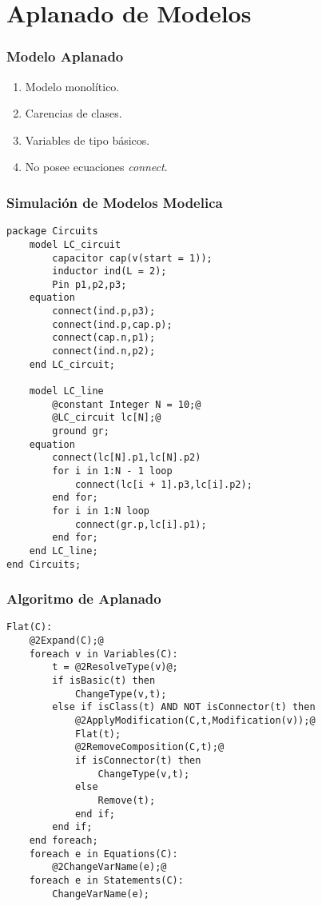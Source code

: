 \section{Aplanado de Modelos}

\begin{frame}[fragile]
\frametitle{Modelo Aplanado} 
\begin{enumerate}
\item Modelo monolítico.
\item Carencias de clases.
\item Variables de tipo básicos.
\item No posee ecuaciones \textit{connect}.


\end{enumerate}
\end{frame}

\begin{frame}[fragile]
\frametitle{Simulación de Modelos Modelica} 
\begin{lstlisting}[style=base,basicstyle=\tiny]
package Circuits
    model LC_circuit
        capacitor cap(v(start = 1));
        inductor ind(L = 2);
        Pin p1,p2,p3;
    equation
        connect(ind.p,p3);
        connect(ind.p,cap.p);
        connect(cap.n,p1);
        connect(ind.n,p2);
    end LC_circuit;
    
    model LC_line
        @constant Integer N = 10;@
        @LC_circuit lc[N];@
        ground gr;
    equation
        connect(lc[N].p1,lc[N].p2)      
        for i in 1:N - 1 loop
            connect(lc[i + 1].p3,lc[i].p2);
        end for;
        for i in 1:N loop
            connect(gr.p,lc[i].p1);
        end for;
    end LC_line;
end Circuits;   
\end{lstlisting}
\end{frame}

\begin{frame}[fragile]
\frametitle{Algoritmo de Aplanado} 
\begin{lstlisting}[style=base,basicstyle=\tiny]
Flat(C):
    @2Expand(C);@
    foreach v in Variables(C):
        t = @2ResolveType(v)@;
        if isBasic(t) then 
            ChangeType(v,t);
        else if isClass(t) AND NOT isConnector(t) then
            @2ApplyModification(C,t,Modification(v));@
            Flat(t);
            @2RemoveComposition(C,t);@  
            if isConnector(t) then
                ChangeType(v,t);
            else
                Remove(t);
            end if;     
        end if;     
    end foreach;    
    foreach e in Equations(C):  
        @2ChangeVarName(e);@
    foreach e in Statements(C): 
        ChangeVarName(e);           
\end{lstlisting}
\end{frame}

